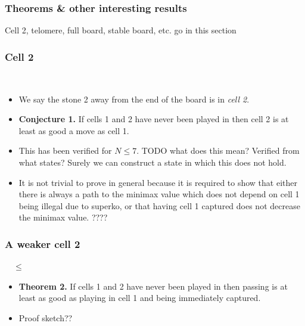 \documentclass{beamer}
\begin{document}
    \begin{frame}
        \frametitle{Theorems \& other interesting results}
        Cell 2, telomere, full board, stable board, etc. go in this section
    \end{frame}

    \begin{frame}
        \frametitle{Cell 2}
        \begin{center}
            \cleargoban
            \showgoban[b2,k2]\\\medskip
        \end{center}
        \begin{itemize}
            \item We say the stone 2 away from the end of the board is in \textit{cell 2}.
            \item \textbf{Conjecture 1.} If cells 1 and 2 have never been played
                in then cell 2 is at least as good a move as cell 1.
            \pause
            \item This has been verified for $N \leq 7$. TODO what does this mean? Verified from what states? Surely we can construct a state in which this does not hold.
            \pause
            \item It is not trivial to prove in general because it is required to show that either there is always a path to the minimax value which does not depend on cell 1 being illegal due to superko, or that having cell 1 captured does not decrease the minimax value. ????
        \end{itemize}
    \end{frame}

    \begin{frame}
        \frametitle{A weaker cell 2}
        \begin{center}
            \cleargoban
            \showgoban[b2,k2]\ \ $\leq$
            \cleargoban
            \showgoban[b2,k2]
        \end{center}
        \begin{itemize}
            \item \textbf{Theorem 2.} If cells 1 and 2 have never been played
                in then passing is at least as good as playing in cell 1 and being immediately captured.
            \pause
            \item Proof sketch??
        \end{itemize}
    \end{frame}
\end{document}
